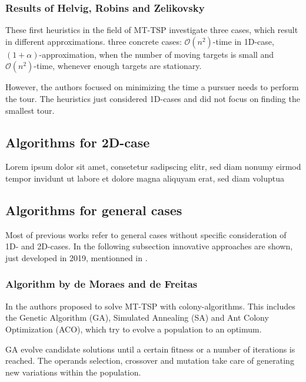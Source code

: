 \documentclass{acm_proc_article-sp}
\begin{document}
\subsubsection{Results of Helvig, Robins and Zelikovsky}

These first heuristics in the field of MT-TSP investigate three cases, which result in different approximations. three concrete cases: $\mathcal{O}(n^2)$-time in 1D-case, $(1+\alpha)$-approximation, when the number of moving targets is small and $\mathcal{O}(n^2)$-time, whenever enough targets are stationary. 

However, the authors focused on minimizing the time a pursuer needs to perform the tour. The heuristics just considered 1D-cases and did not focus on finding the smallest tour.



\subsection{Algorithms for 2D-case}
Lorem ipsum dolor sit amet, consetetur sadipscing elitr, sed diam nonumy eirmod tempor invidunt ut labore et dolore magna aliquyam erat, sed diam voluptua

\subsection{Algorithms for general cases}
Most of previous works refer to general cases without specific consideration of 1D- and 2D-cases. In the following subsection innovative approaches are shown, just developed in 2019, mentionned in \cite{moraes}.

\subsubsection{Algorithm by de Moraes and de Freitas}
In \cite{moraes} the authors proposed to solve MT-TSP with colony-algorithms. This includes the Genetic Algorithm (GA), Simulated Annealing (SA) and Ant Colony Optimization (ACO), which try to evolve a population to an optimum.

GA evolve candidate solutions until a certain fitness or a number of iterations is reached. The operands selection, crossover and mutation take care of generating new variations within the population. 
\end{document}
